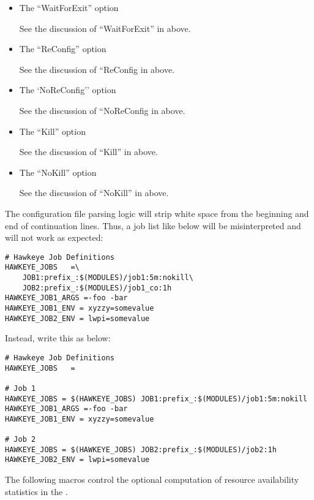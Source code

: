 \begin{description}
\begin{itemize}
\begin{itemize}
	\item The ``WaitForExit'' option

	See the discussion of ``WaitForExit'' in
	 above.

	\item The ``ReConfig'' option

	See the discussion of ``ReConfig in
	 above.

	\item The `NoReConfig'' option

	See the discussion of ``NoReConfig in
	 above.

	\item The ``Kill'' option

	See the discussion of ``Kill'' in
	 above.

	\item The ``NoKill'' option

	See the discussion of ``NoKill'' in
	 above.

    \end{itemize}
	
  \end{itemize}
\Note The configuration file parsing logic will strip white space from
the beginning and end of continuation lines.  Thus, a job list like
below will be misinterpreted and will not work as expected:
\begin{verbatim}
# Hawkeye Job Definitions
HAWKEYE_JOBS   =\
    JOB1:prefix_:$(MODULES)/job1:5m:nokill\
    JOB2:prefix_:$(MODULES)/job1_co:1h
HAWKEYE_JOB1_ARGS =-foo -bar
HAWKEYE_JOB1_ENV = xyzzy=somevalue
HAWKEYE_JOB2_ENV = lwpi=somevalue
\end{verbatim}
Instead, write this as below:
\begin{verbatim}
# Hawkeye Job Definitions
HAWKEYE_JOBS   =

# Job 1
HAWKEYE_JOBS = $(HAWKEYE_JOBS) JOB1:prefix_:$(MODULES)/job1:5m:nokill
HAWKEYE_JOB1_ARGS =-foo -bar
HAWKEYE_JOB1_ENV = xyzzy=somevalue

# Job 2
HAWKEYE_JOBS = $(HAWKEYE_JOBS) JOB2:prefix_:$(MODULES)/job2:1h
HAWKEYE_JOB2_ENV = lwpi=somevalue
\end{verbatim}


\end{description}

The following macros control the optional computation of resource
availability statistics in the .

